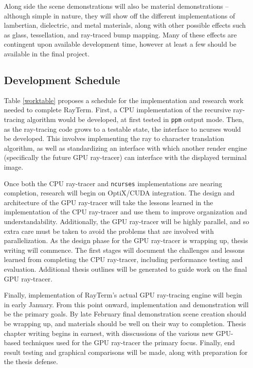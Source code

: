 \documentclass[11pt]{article}
\newcommand{\name}{{\sc RayTerm}}
\begin{document}
Along side the scene demonstrations will also be material demonstrations -- although simple in nature, they will show off the different implementations of lambertian, dielectric, and metal materials, along with other possible effects such as glass, tessellation, and ray-traced bump mapping.
Many of these effects are contingent upon available development time, however at least a few should be available in the final project.

\subsection{Development Schedule}
\label{sec:schedule}


Table \ref{worktable} proposes a schedule for the implementation and research work needed to complete \name.
First, a CPU implementation of the recursive ray-tracing algorithm would be developed, at first tested in \texttt{ppm} output mode.
Then, as the ray-tracing code grows to a testable state, the interface to ncurses would be developed.
This involves implementing the ray to character translation algorithm, as well as standardizing an interface with which another render engine (specifically the future GPU ray-tracer) can interface with the displayed terminal image.

Once both the CPU ray-tracer and \texttt{ncurses} implementations are nearing completion, research will begin on OptiX/CUDA integration.
The design and architecture of the GPU ray-tracer will take the lessons learned in the implementation of the CPU ray-tracer and use them to improve organization and understandability.
Additionally, the GPU ray-tracer will be highly parallel, and so extra care must be taken to avoid the problems that are involved with parallelization.
As the design phase for the GPU ray-tracer is wrapping up, thesis writing will commence.
The first stages will document the challenges and lessons learned from completing the CPU ray-tracer, including performance testing and evaluation.
Additional thesis outlines will be generated to guide work on the final GPU ray-tracer.

Finally, implementation of \name's actual GPU ray-tracing engine will begin in early January.
From this point onward, implementation and demonstration will be the primary goals.
By late February final demonstration scene creation should be wrapping up, and materials should be well on their way to completion.
Thesis chapter writing begins in earnest, with disscussions of the various new GPU-based techniques used for the GPU ray-tracer the primary focus.
Finally, end result testing and graphical comparisons will be made, along with preparation for the thesis defense.
\end{document}
